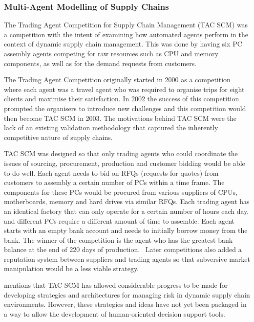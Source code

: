 \subsubsection{Multi-Agent Modelling of Supply Chains}

The Trading Agent Competition for Supply Chain Management (TAC SCM) was a competition with the intent of examining how automated agents perform in the context of dynamic supply chain management.
This was done by having six PC assembly agents competing for raw resources such as CPU and memory components, as well as for the demand requests from customers.~\cite{sadeh2003tac}

The Trading Agent Competition originally started in 2000 as a competition where each agent was a travel agent who was required to organise trips for eight clients and maximise their satisfaction.
In 2002 the success of this competition prompted the organisers to introduce new challenges and this competition would then become TAC SCM in 2003.
The motivations behind TAC SCM were the lack of an existing validation methodology that captured the inherently competitive nature of supply chains.~\cite{arunachalam2005supply}

TAC SCM was designed so that only trading agents who could coordinate the issues of sourcing, procurement, production and customer bidding would be able to do well.
Each agent needs to bid on RFQs (requests for quotes) from customers to assembly a certain number of PCs within a time frame.
The components for these PCs would be procured from various suppliers of CPUs, motherboards, memory and hard drives via similar RFQs.
Each trading agent has an identical factory that can only operate for a certain number of hours each day, and different PCs require a different amount of time to assemble.
Each agent starts with an empty bank account and needs to initially borrow money from the bank.
The winner of the competition is the agent who has the greatest bank balance at the end of 220 days of production.~\cite{arunachalam2005supply}
Later competitions also added a reputation system between suppliers and trading agents so that subversive market manipulation would be a less viable strategy.~\cite{collins2010pushing}

 mentions that TAC SCM has allowed considerable pro\-gress to be made for developing strategies and architectures for managing risk in dynamic supply chain environments.
However, these strategies and ideas have not yet been packaged in a way to allow the development of human-oriented decision support tools.

